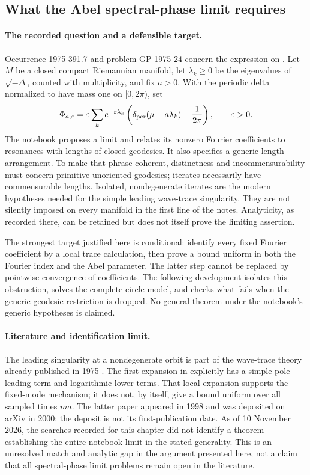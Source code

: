 \subsection{What the Abel spectral-phase limit requires}
\label{dev:spectralphases}

\paragraph{The recorded question and a defensible target.}
Occurrence 1975-391.7 and problem GP-1975-24 concern the expression on
. Let \(M\) be a closed compact Riemannian manifold,
let \(\lambda_k\geq0\) be the eigenvalues of \(\sqrt{-\Delta}\), counted
with multiplicity, and fix \(a>0\). With the periodic delta normalized to
have mass one on \([0,2\pi)\), set
\[
 \Phi_{a,\varepsilon}=\varepsilon\sum_k e^{-\varepsilon\lambda_k}
 \left(\delta_{\rm per}(\mu-a\lambda_k)-\frac1{2\pi}\right),
 \qquad \varepsilon>0.
\]
The notebook proposes a limit and relates its nonzero Fourier coefficients
to resonances with lengths of closed geodesics. It also specifies a generic
length arrangement. To make that phrase coherent, distinctness and
incommensurability must concern primitive unoriented geodesics; iterates
necessarily have commensurable lengths. Isolated, nondegenerate iterates
are the modern hypotheses needed for the simple leading wave-trace
singularity. They are not silently imposed on every manifold in the first
line of the notes. Analyticity, as recorded there, can be retained but
does not itself prove the limiting assertion.

The strongest target justified here is conditional: identify every fixed
Fourier coefficient by a local trace calculation, then prove a bound
uniform in both the Fourier index and the Abel parameter. The latter
step cannot be replaced by pointwise convergence of coefficients. The
following development isolates this obstruction, solves the complete
circle model, and checks what fails when the generic-geodesic restriction
is dropped. No general theorem under the notebook's generic hypotheses
is claimed.

\paragraph{Literature and identification limit.}
The leading singularity at a nondegenerate orbit is part of the
wave-trace theory already published in 1975
\citep{duistermaatguillemin1975spectrum}.
The first expansion in \citet[Introduction]{zelditch1998wave} explicitly
has a simple-pole leading term and logarithmic lower terms. That local
expansion supports the fixed-mode mechanism; it does not, by itself,
give a bound uniform over all sampled times \(ma\).
The latter paper appeared in 1998 and was deposited on arXiv in 2000;
the deposit is not its first-publication date.
As of 10 November 2026, the searches recorded for this chapter did not
identify a theorem establishing the entire notebook limit in the stated
generality. This is an unresolved match and analytic gap in the argument
presented here, not a claim that all spectral-phase limit problems remain
open in the literature.

